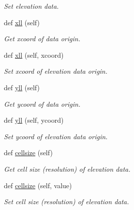 \begin{DoxyCompactItemize}
\begin{DoxyCompactList}\small\item\em Set elevation data. \end{DoxyCompactList}\item 
def \hyperlink{classbridges_1_1data__src__dependent_1_1elevation_1_1_elevation_data_ac3469390be93e68a08f0f74b6ef78f8e}{xll} (self)
\begin{DoxyCompactList}\small\item\em Get xcoord of data origin. \end{DoxyCompactList}\item 
def \hyperlink{classbridges_1_1data__src__dependent_1_1elevation_1_1_elevation_data_aaad3b51143ed23979db7dcbc3cfefb21}{xll} (self, xcoord)
\begin{DoxyCompactList}\small\item\em Set xcoord of elevation data origin. \end{DoxyCompactList}\item 
def \hyperlink{classbridges_1_1data__src__dependent_1_1elevation_1_1_elevation_data_aeaaf72164ecbbfea73ce2adddad7db83}{yll} (self)
\begin{DoxyCompactList}\small\item\em Get ycoord of data origin. \end{DoxyCompactList}\item 
def \hyperlink{classbridges_1_1data__src__dependent_1_1elevation_1_1_elevation_data_a049e200c9a03fbf3cfcb7c4085c7e659}{yll} (self, ycoord)
\begin{DoxyCompactList}\small\item\em Set ycoord of elevation data origin. \end{DoxyCompactList}\item 
def \hyperlink{classbridges_1_1data__src__dependent_1_1elevation_1_1_elevation_data_a088a13bbf7e3bf3136b32bfb230ca401}{cellsize} (self)
\begin{DoxyCompactList}\small\item\em Get cell size (resolution) of elevation data. \end{DoxyCompactList}\item 
def \hyperlink{classbridges_1_1data__src__dependent_1_1elevation_1_1_elevation_data_ae0a6da66724a54c9344b7f057b37a805}{cellsize} (self, value)
\begin{DoxyCompactList}\small\item\em Set cell size (resolution) of elevation data. \end{DoxyCompactList}\item 

\end{DoxyCompactItemize}
